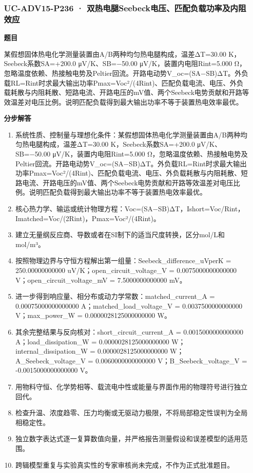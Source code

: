 \documentclass[UTF8,11pt,a4paper]{ctexart}
\begin{document}
\subsubsection*{UC-ADV15-P236 · 双热电腿Seebeck电压、匹配负载功率及内阻效应}
\noindent\textbf{题目}\par
某假想固体热电化学测量装置由A/B两种均匀热电腿构成，温差ΔT=30.00 K，Seebeck系数SA=+200.0 μV/K、SB=−50.00 μV/K，装置内电阻Rint=5.000 Ω，忽略温度依赖、热接触电势及Peltier回流。开路电动势V\_oc=(SA−SB)ΔT。外负载RL=Rint时求最大输出功率Pmax=Voc²/(4Rint)、匹配负载电流、电压、外负载耗散与内阻耗散、短路电流、开路电压的mV值、两个Seebeck电势贡献和开路等效温差对电压比例。说明匹配负载得到最大输出功率不等于装置热电效率最优。\par
\medskip\noindent\textbf{分步解答}
\begin{enumerate}
\item 系统性质、控制量与理想化条件：某假想固体热电化学测量装置由A/B两种均匀热电腿构成，温差ΔT=30.00 K，Seebeck系数SA=+200.0 μV/K、SB=−50.00 μV/K，装置内电阻Rint=5.000 Ω，忽略温度依赖、热接触电势及Peltier回流。开路电动势V\_oc=(SA−SB)ΔT。外负载RL=Rint时求最大输出功率Pmax=Voc²/(4Rint)、匹配负载电流、电压、外负载耗散与内阻耗散、短路电流、开路电压的mV值、两个Seebeck电势贡献和开路等效温差对电压比例。说明匹配负载得到最大输出功率不等于装置热电效率最优。
\item 核心热力学、输运或统计物理方程：Voc=(SA−SB)ΔT，Ishort=Voc/Rint，Imatched=Voc/(2Rint)，Pmax=Voc²/(4Rint)。
\item 建立无量纲反应商、导数或者在SI制下的适当尺度转换，区分mol/L和mol/m³。
\item 按照物理边界与守恒方程解出第一组量：Seebeck\_difference\_uVperK = 250.00000000000 uV/K；open\_circuit\_voltage\_V = 0.0075000000000000 V；open\_circuit\_voltage\_mV = 7.5000000000000 mV。
\item 进一步得到响应量、相分布或动力学常数：matched\_current\_A = 0.00075000000000000 A；matched\_load\_voltage\_V = 0.0037500000000000 V；max\_power\_W = 0.0000028125000000000 W。
\item 其余完整结果与反向核对：short\_circuit\_current\_A = 0.0015000000000000 A；load\_dissipation\_W = 0.0000028125000000000 W；internal\_dissipation\_W = 0.0000028125000000000 W；A\_Seebeck\_voltage\_V = 0.0060000000000000 V；B\_Seebeck\_voltage\_V = -0.0015000000000000 V。
\item 用物料守恒、化学势相等、载流电中性或能量与界面作用的物理符号进行独立回代。
\item 检查升温、浓度趋零、压力均衡或无驱动力极限，不将局部稳定性误判为全局相稳定性。
\item 独立数字表达式逐一复算数值向量，并严格报告测量假设和误差模型的适用范围。
\item 跨辑模型重复与实验真实性的专家审核尚未完成，不作为正式批准题目。
\end{enumerate}
\end{document}
